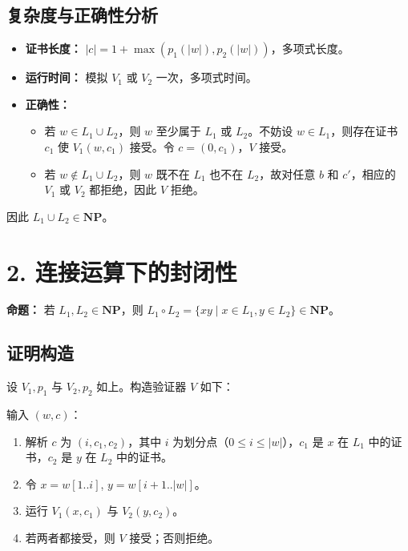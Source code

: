 \documentclass[11pt,addpoints,answers]{exam}
\begin{document}
\begin{questions}
\begin{solution}
    \subsection*{复杂度与正确性分析}
    \begin{itemize}
        \item \textbf{证书长度：} $|c| = 1 + \max(p_1(|w|), p_2(|w|))$，多项式长度。
        \item \textbf{运行时间：} 模拟 $V_1$ 或 $V_2$ 一次，多项式时间。
        \item \textbf{正确性：}
            \begin{itemize}
                \item 若 $w \in L_1 \cup L_2$，则 $w$ 至少属于 $L_1$ 或 $L_2$。不妨设 $w \in L_1$，则存在证书 $c_1$ 使 $V_1(w,c_1)$ 接受。令 $c = (0, c_1)$，$V$ 接受。
                \item 若 $w \notin L_1 \cup L_2$，则 $w$ 既不在 $L_1$ 也不在 $L_2$，故对任意 $b$ 和 $c'$，相应的 $V_1$ 或 $V_2$ 都拒绝，因此 $V$ 拒绝。
            \end{itemize}
    \end{itemize}
    
    因此 $L_1 \cup L_2 \in \mathbf{NP}$。
    
    \section*{2. 连接运算下的封闭性}
    
    \textbf{命题：} 若 $L_1, L_2 \in \mathbf{NP}$，则 $L_1 \circ L_2 = \{ xy \mid x \in L_1, y \in L_2 \} \in \mathbf{NP}$。
    
    \subsection*{证明构造}
    设 $V_1, p_1$ 与 $V_2, p_2$ 如上。构造验证器 $V$ 如下：
    
    \noindent 输入 $(w, c)$：
    \begin{enumerate}
        \item 解析 $c$ 为 $(i, c_1, c_2)$，其中 $i$ 为划分点（$0 \le i \le |w|$），$c_1$ 是 $x$ 在 $L_1$ 中的证书，$c_2$ 是 $y$ 在 $L_2$ 中的证书。
        \item 令 $x = w[1..i]$, $y = w[i+1..|w|]$。
        \item 运行 $V_1(x, c_1)$ 与 $V_2(y, c_2)$。
        \item 若两者都接受，则 $V$ 接受；否则拒绝。
    \end{enumerate}
    

\end{solution}
\end{questions}
\end{document}
